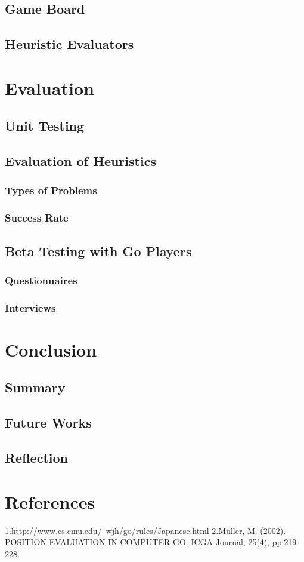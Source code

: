 \documentclass{l4proj}
\begin{document}
\section{Game Board}

\section{Heuristic Evaluators}








\chapter{Evaluation}

\section{Unit Testing}

\section{Evaluation of Heuristics}
\subsection{Types of Problems}
\subsection{Success Rate}

\section{Beta Testing with Go Players}
\subsection{Questionnaires}
\subsection{Interviews}






\chapter{Conclusion}

\section{Summary}

\section{Future Works}

\section{Reflection}


\chapter{References}
1.http://www.cs.cmu.edu/~wjh/go/rules/Japanese.html
2.Müller, M. (2002). POSITION EVALUATION IN COMPUTER GO. ICGA Journal, 25(4), pp.219-228.
\end{document}
